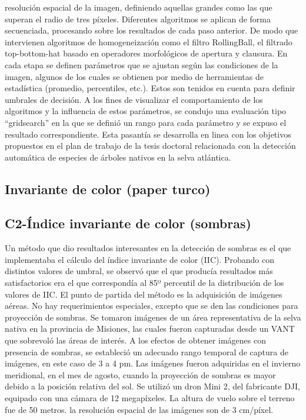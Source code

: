 resolución espacial de la imagen, definiendo aquellas grandes como las que superan el radio
de tres píxeles. Diferentes algoritmos se aplican de forma secuenciada, procesando sobre los
resultados de cada paso anterior. De modo que intervienen algoritmos de homogeneización
como el filtro RollingBall, el filtrado top-bottom-hat basado en operadores morfológicos de apertura y clausura. En cada etapa se definen parámetros que se ajustan según las condiciones
de la imagen, algunos de los cuales se obtienen por medio de herramientas de estadística
(promedio, percentiles, etc.). Estos son tenidos en cuenta para definir umbrales de decisión. A
los fines de visualizar el comportamiento de los algoritmos y la influencia de estos parámetros,
se condujo una evaluación tipo “gridsearch” en la que se definió un rango para cada parámetro
y se expuso el resultado correspondiente. Esta pasantía se desarrolla en linea con los objetivos
propuestos en el plan de trabajo de la tesis doctoral relacionada con la detección automática
de especies de árboles nativos en la selva atlántica. 
\subsection{Invariante de color (paper turco)}
\subsection{C2-Índice invariante de color (sombras)}
Un método que dio resultados interesantes en la detección de sombras es el que implementaba el cálculo del índice invariante de color (IIC). Probando con distintos valores de umbral, se observó que el que producía resultados más satisfactorios era el que correspondía al 85º percentil de la distribución de los valores de IIC.
El punto de partida del método es la adquisición de imágenes aéreas. No hay requerimientos especiales, excepto que se den las condiciones para proyección de sombras. Se tomaron imágenes de un área representativa de la selva nativa en la provincia de Misiones, las cuales fueron capturadas desde un VANT que sobrevoló las áreas de interés. A los efectos de obtener imágenes con presencia de sombras, se estableció un adecuado rango temporal de captura de imágenes, en este caso de 3 a 4 pm. Las imágenes fueron adquiridas en el invierno meridional, en el mes de agosto, cuando la proyección de sombras es mayor debido a la posición relativa del sol. Se utilizó un dron Mini 2, del fabricante DJI, equipado con una cámara de 12 megapíxeles. La altura de vuelo sobre el terreno fue de 50 metros. la resolución espacial de las imágenes son de 3 cm/píxel.
